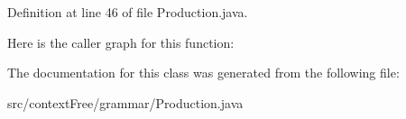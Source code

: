 Definition at line 46 of file Production.\-java.



Here is the caller graph for this function\-:




The documentation for this class was generated from the following file\-:\begin{DoxyCompactItemize}
\item 
src/context\-Free/grammar/Production.\-java\end{DoxyCompactItemize}
